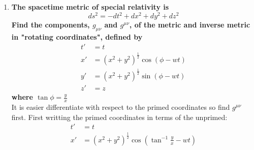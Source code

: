 \documentclass[a4paper]{article}
\begin{document}
\begin{enumerate}
\begin{enumerate}
\[\[\begin{align*}
    &=
     -r \sin\theta \cos\theta \frac{\tan\phi \sec^2\phi}{(1+\tan^2\phi)^2}
    + r \cos\theta\sin\theta \frac{\tan\phi \sec^2\phi}{(1+\tan^2\phi)^2}\\
    &= 0
    \end{align*}
  \]
  \[
    \begin{align*}
      g_{\theta,\phi} = g_{\phi, \theta} &=
    g_{x,x}\frac{\partial x}{\partial \theta} \frac{\partial x}{\partial \phi}+
    g_{y,y}\frac{\partial y}{\partial \theta} \frac{\partial y}{\partial \phi}+
    g_{z,z}\frac{\partial z}{\partial \theta} \frac{\partial z}{\partial \phi}\\
    &=-r\frac{\cos\theta}{\sqrt{1+\tan^2\phi}}\Bigg(-r\sin\theta\frac{\tan\phi\sec^2\phi}{(1+\tan^2\phi)^\frac{3}{2}}\Bigg)
    -r\tan\phi\frac{\cos\theta}{\sqrt{1+\tan^2\phi}}\Bigg(r \sin\theta \frac{\sec^2\phi}{(1+\tan^2\phi)^\frac{3}{2}} \Bigg)\\
  &=r^2\sin\theta\cos\theta\frac{\tan\phi\sec^2\phi}{(1+\tan^2\phi)^2}
  -r^2 \sin \theta \cos\theta\frac{\tan\phi\sec^2\phi}{(1+\tan^2\phi)^2}\\
  &= 0
    \end{align*}
  \]
  Therefore the metric components in spherical polar coordinates are:
  \[
    g_{\mu, \nu} =
    \begin{bmatrix}
      1 && 0 && 0 \\
      0 && r^2 && 0 \\
      0 && 0 && r^2\sin^2\theta
    \end{bmatrix}
  \]
  \item
  \textbf{The spacetime metric of special relativity is}
  \[
  ds^2=-dt^2+dx^2+dy^2+dz^2
  \]
  \textbf{Find the components, $g_{\mu\nu}$ and $g^{\mu\nu}$, of the metric and
  inverse metric in "rotating coordinates", defined by}
  \[
    \begin{align*}
      t'&=t\\
      x'&=(x^2+y^2)^\frac{1}{2}\cos(\phi-wt)\\
      y'&=(x^2+y^2)^\frac{1}{2}\sin(\phi-wt)\\
      z'&=z
    \end{align*}
  \]
  \textbf{where $\tan\phi = \frac{y}{x}$}\\
  It is easier differentiate with respect to the primed coordinates so find
  $g^{\mu\nu}$ first. First writting the primed coordinates in terms of the
  unprimed:
  \[
  \begin{align*}
    t' &= t\\
    x' &= (x^2+y^2)^\frac{1}{2}\cos(\tan^{-1}\frac{y}{x} - wt)\\

\end{align*}\]\]
\end{enumerate}
\end{enumerate}
\end{document}

